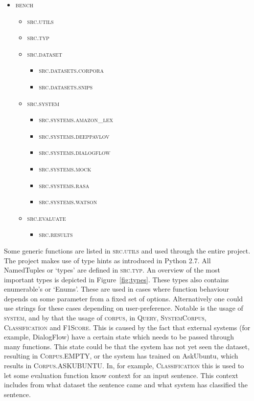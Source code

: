 \begin{itemize}
    \item \textsc{bench}
    \begin{itemize}
        \item \textsc{src.utils}
        \item \textsc{src.typ}
        \item \textsc{src.dataset}
        \begin{itemize}
            \item \textsc{src.datasets.corpora}
            \item \textsc{src.datasets.snips}
        \end{itemize}
        \item \textsc{src.system}
        \begin{itemize}
            \item \textsc{src.systems.amazon\_lex}
            \item \textsc{src.systems.deeppavlov}
            \item \textsc{src.systems.dialogflow}
            \item \textsc{src.systems.mock}
            \item \textsc{src.systems.rasa}
            \item \textsc{src.systems.watson}
        \end{itemize}
        \item \textsc{src.evaluate}
        \begin{itemize}
            \item \textsc{src.results}
        \end{itemize}
    \end{itemize}
\end{itemize}

Some generic functions are listed in \textsc{src.utils} and used through the entire project.
The project makes use of type hints as introduced in Python 2.7.
All NamedTuples or `types' are defined in \textsc{src.typ}.
An overview of the most important types is depicted in Figure~\ref{fig:types}.
These types also contains enumerable's or `Enums'.
These are used in cases where function behaviour depends on some parameter from a fixed set of options.
Alternatively one could use strings for these cases depending on user-preference.
Notable is the usage of \textsc{system}, and by that the usage of \textsc{corpus}, in \textsc{Query}, \textsc{SystemCorpus}, \textsc{Classification} and \textsc{F1Score}.
This is caused by the fact that external systems (for example, DialogFlow) have a certain state which needs to be passed through many functions.
This state could be that the system has not yet seen the dataset, resulting in \textsc{Corpus.EMPTY}, or the system has trained on AskUbuntu, which results in \textsc{Corpus.ASKUBUNTU}.
In, for example, \textsc{Classification} this is used to let some evaluation function know context for an input sentence.
This context includes from what dataset the sentence came and what system has classified the sentence.

